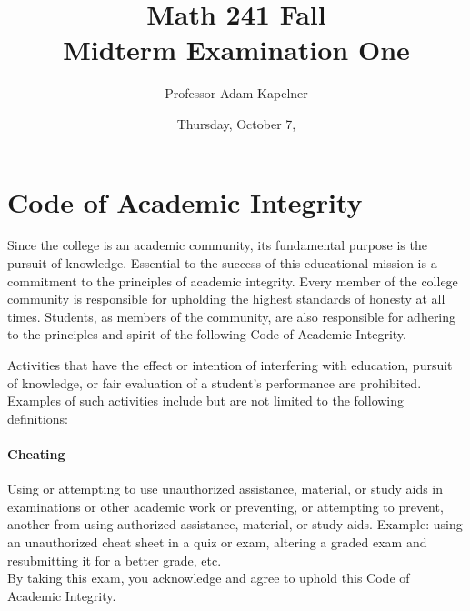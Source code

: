 \documentclass[12pt,landscape]{article}
\title{Math 241 Fall \the\year{} \\ Midterm Examination One}
\author{Professor Adam Kapelner}
\date{Thursday, October 7, \the\year{}}
\begin{document}
\maketitle


\thispagestyle{empty}

\section*{Code of Academic Integrity}

\footnotesize
Since the college is an academic community, its fundamental purpose is the pursuit of knowledge. Essential to the success of this educational mission is a commitment to the principles of academic integrity. Every member of the college community is responsible for upholding the highest standards of honesty at all times. Students, as members of the community, are also responsible for adhering to the principles and spirit of the following Code of Academic Integrity.

Activities that have the effect or intention of interfering with education, pursuit of knowledge, or fair evaluation of a student's performance are prohibited. Examples of such activities include but are not limited to the following definitions:

\paragraph{Cheating} Using or attempting to use unauthorized assistance, material, or study aids in examinations or other academic work or preventing, or attempting to prevent, another from using authorized assistance, material, or study aids. Example: using an unauthorized cheat sheet in a quiz or exam, altering a graded exam and resubmitting it for a better grade, etc.
\\

\noindent By taking this exam, you acknowledge and agree to uphold this Code of Academic Integrity. \\


\normalsize
\end{document}
